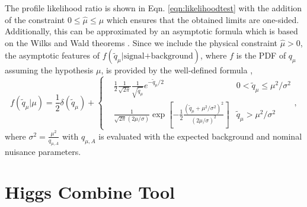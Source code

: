 The profile likelihood ratio is shown in Eqn. \ref{eqn:likelihoodtest} with the addition of the constraint $0\leq\widehat{\mu}\leq\mu$ which ensures that the obtained limits are one-sided. Additionally, this can be approximated by an asymptotic formula which is based on the Wilks and Wald theorems \cite{cowan_asymptotic_2011}. Since we include the physical constraint $\widehat{\mu}>0$, the asymptotic features of $f(\widetilde{q}_\mu|\text{signal+background})$, where $f$ is the PDF of $q_\mu$ assuming the hypothesis $\mu$, is provided by the well-defined formula \cite{cowan_asymptotic_2011}, 
\begin{equation}\label{eqn:profileLikelihood}
f(\widetilde{q}_\mu|\mu)=\frac{1}{2}\delta(\widetilde{q}_\mu)+\left\{
\begin{split}
&\frac{1}{2}\frac{1}{\sqrt{2\pi}}\frac{1}{\sqrt{\widetilde{q}_\mu}}e^{-\widetilde{q}_\mu/2} & 0<\widetilde{q}_\mu\leq\mu^2/\sigma^2 \\
&\frac{1}{\sqrt{2\pi}(2\mu/\sigma)}\exp[-\frac{1}{2}\frac{(\widetilde{q}_\mu+\mu^2/\sigma^2)^2}{(2\mu/\sigma)^2}] & \widetilde{q}_\mu>\mu^2/\sigma^2
\end{split},
\end{equation}
where $\sigma^2=\frac{\mu^2}{q_{\mu,A}}$ with $q_{\mu,A}$ is evaluated with the expected background and nominal nuisance parameters. 

\section{Higgs Combine Tool}\label{sec:HiggsCombine}

